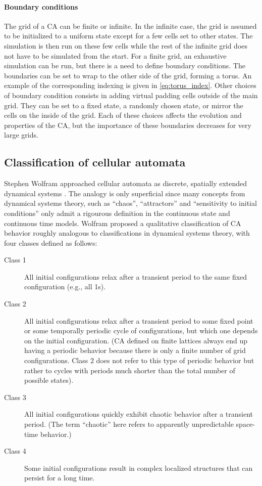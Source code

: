\paragraph{Boundary conditions}
The grid of a \ac{CA} can be finite or infinite. In the infinite case, the grid
is assumed to be initialized to a uniform state except for a few cells set to
other states. The simulation is then run on these few cells while the rest of
the infinite grid does not have to be simulated from the start. For a finite
grid, an exhaustive simulation can be run, but there is a need to define
boundary conditions. The boundaries can be set to wrap to the other side of the
grid, forming a torus. An example of the corresponding indexing is given in
\eqref{eq:torus_index}. Other choices of boundary condition consists in adding
virtual padding cells outside of the main grid. They can be set to a fixed
state, a randomly chosen state, or mirror the cells on the inside of the grid.
Each of these choices affects the evolution and properties of the \ac{CA}, but
the importance of these boundaries decreases for very large grids.

\subsection{Classification of cellular automata\label{sec:class-cell-autom}}

Stephen Wolfram approached cellular automata as discrete, spatially extended
dynamical systems \parencite{wolframUniversalityComplexityCellular1984}. The
analogy is only superficial since many concepts from dynamical systems theory,
such as ``chaos'', ``attractors'' and ``sensitivity to initial conditions'' only
admit a rigourous definition in the continuous state and continuous time models.
Wolfram proposed a qualitative classification of CA behavior roughly analogous
to classifications in dynamical systems theory, with four classes defined as follows:

\begin{description}
  \item[Class 1] All initial configurations relax after a transient
        period to the same fixed configuration (e.g., all 1s).
  \item[Class 2] All initial configurations relax after a transient period to some
        fixed point or some temporally periodic cycle of configurations, but
        which one depends on the initial configuration. (\ac{CA} defined on
        finite lattices always end up having a periodic behavior because there
        is only a finite number of grid configurations. Class 2 does not refer to
        this type of periodic behavior but rather to cycles with periods much
        shorter than the total number of possible states).
  \item[Class 3] All initial configurations quickly exhibit chaotic behavior
        after a transient period. (The term “chaotic” here refers to
        apparently unpredictable space-time behavior.)
  \item[Class 4] Some initial configurations result in complex localized
        structures that can persist for a long time.
\end{description}


